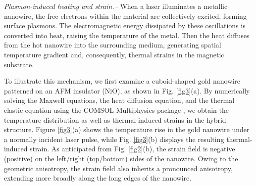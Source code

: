 \documentclass[aps,prl,reprint,floatfix,longbibliography,twocolumn]{revtex4-2}
\begin{document}
\textit{Plasmon-induced heating and strain.--} When a laser illuminates a metallic nanowire, the free electrons within the material are collectively excited, forming surface plasmons. The electromagnetic energy dissipated by these oscillations is converted into heat, raising the temperature of the metal. Then the heat diffuses from the hot nanowire into the surrounding medium, generating spatial temperature gradient and, consequently, thermal strains in the magnetic substrate.

To illustrate this mechanism, we first examine a cuboid-shaped gold nanowire patterned on an AFM insulator (NiO), as shown in Fig. \ref{fig3}(a). By numerically solving the Maxwell equations, the heat diffusion equation, and the thermal elastic equation using the COMSOL Multiphysics package \cite{comsol,Endmater}, we obtain the temperature distribution as well as thermal-induced strains in the hybrid structure.
Figure \ref{fig3}(a) shows the temperature rise in the gold nanowire under a normally incident laser pulse, while Fig. \ref{fig3}(b) displays the resulting thermal-induced strain. As anticipated from Fig. \ref{fig2}(b), the strain field is negative (positive) on the left/right (top/bottom) sides of the nanowire. Owing to the geometric anisotropy, the strain field also inherits a pronounced anisotropy, extending more broadly along the long edges of the nanowire.
\end{document}
